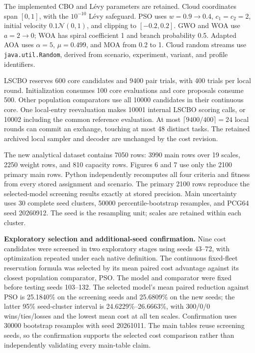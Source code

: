 The implemented CBO and L\'{e}vy parameters are retained. Cloud coordinates span $[0,1]$, with the $10^{-10}$ L\'{e}vy safeguard. PSO uses $w=0.9\rightarrow0.4$, $c_1=c_2=2$, initial velocity $0.1\mathcal N(0,1)$, and clipping to $[-0.2,0.2]$. GWO and WOA use $a=2\rightarrow0$; WOA has spiral coefficient 1 and branch probability 0.5. Adapted AOA uses $\alpha=5$, $\mu=0.499$, and MOA from 0.2 to 1. Cloud random streams use \texttt{java.util.Random}, derived from scenario, experiment, variant, and profile identifiers.

LSCBO reserves 600 core candidates and 9400 pair trials, with 400 trials per local round. Initialization consumes 100 core evaluations and core proposals consume 500. Other population comparators use all 10000 candidates in their continuous core. One local-entry reevaluation makes 10001 internal LSCBO scoring calls, or 10002 including the common reference evaluation. At most $\lceil9400/400\rceil=24$ local rounds can commit an exchange, touching at most 48 distinct tasks. The retained archived local sampler and decoder are unchanged by the cost revision.

The new analytical dataset contains 7050 rows: 3990 main rows over 19 scales, 2250 weight rows, and 810 capacity rows. Figures 6 and 7 use only the 2100 primary main rows. Python independently recomputes all four criteria and fitness from every stored assignment and scenario. The primary 2100 rows reproduce the selected-model screening results exactly at stored precision. Main uncertainty uses 30 complete seed clusters, 50000 percentile-bootstrap resamples, and PCG64 seed 20260912. The seed is the resampling unit; scales are retained within each cluster.

\textbf{Exploratory selection and additional-seed confirmation.}
Nine cost candidates were screened in two exploratory stages using seeds 43--72, with optimization repeated under each native definition. The continuous fixed-fleet reservation formula was selected by its mean paired cost advantage against its closest population comparator, PSO. The model and comparator were fixed before testing seeds 103--132. The selected model's mean paired reduction against PSO is 25.1840\% on the screening seeds and 25.6809\% on the new seeds; the latter 95\% seed-cluster interval is 24.6229\%--26.6663\%, with 300/0/0 wins/ties/losses and the lowest mean cost at all ten scales. Confirmation uses 30000 bootstrap resamples with seed 20261011. The main tables reuse screening seeds, so the confirmation supports the selected cost comparison rather than independently validating every main-table claim.

